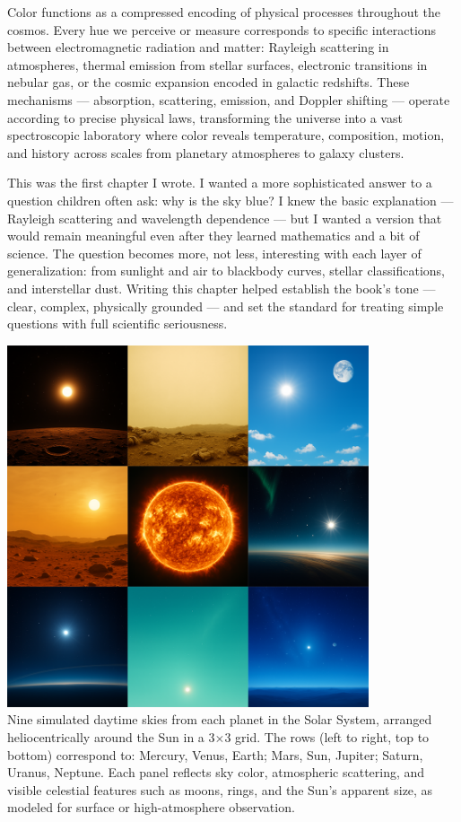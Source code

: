 Color functions as a compressed encoding of physical processes throughout the cosmos. Every hue we perceive or measure corresponds to specific interactions between electromagnetic radiation and matter: Rayleigh scattering in atmospheres, thermal emission from stellar surfaces, electronic transitions in nebular gas, or the cosmic expansion encoded in galactic redshifts. These mechanisms — absorption, scattering, emission, and Doppler shifting — operate according to precise physical laws, transforming the universe into a vast spectroscopic laboratory where color reveals temperature, composition, motion, and history across scales from planetary atmospheres to galaxy clusters.

\newpage

\begin{commentary}
This was the first chapter I wrote. I wanted a more sophisticated answer to a question children often ask: why is the sky blue? I knew the basic explanation --- Rayleigh scattering and wavelength dependence --- but I wanted a version that would remain meaningful even after they learned mathematics and a bit of science. The question becomes more, not less, interesting with each layer of generalization: from sunlight and air to blackbody curves, stellar classifications, and interstellar dust. Writing this chapter helped establish the book's tone --- clear, complex, physically grounded --- and set the standard for treating simple questions with full scientific seriousness.
\end{commentary}


\begin{center}
    \includegraphics[width=0.8\textwidth]{27_PlanetarySkyColors/SKIES.png}\\
    {Nine simulated daytime skies from each planet in the Solar System, arranged heliocentrically around the Sun in a 3$\times$3 grid. The rows (left to right, top to bottom) correspond to: Mercury, Venus, Earth; Mars, Sun, Jupiter; Saturn, Uranus, Neptune. Each panel reflects sky color, atmospheric scattering, and visible celestial features such as moons, rings, and the Sun's apparent size, as modeled for surface or high-atmosphere observation.
    }   
\end{center}